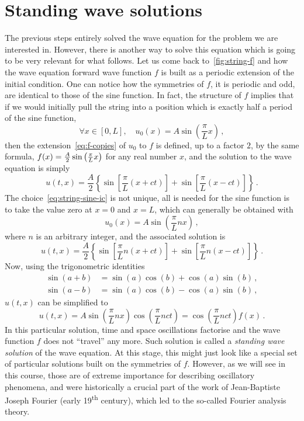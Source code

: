 \section{Standing wave solutions}
The previous steps entirely solved the wave equation for the problem we are interested in.
However, there is another way to solve this equation which is going to be very relevant
for what follows. Let us come back to~\cref{fig:string-f} and how the wave equation
forward wave function $f$ is built as a periodic extension of the initial condition. One
can notice how the symmetries of $f$, \ie it is periodic and odd, are identical to those
of the sine function. In fact, the structure of $f$ implies that if we would initially
pull the string into a position which is exactly half a period of the sine function, \ie
\begin{equation}
  \forall x\in[0,L],\quad u_0(x)=A\sin\left(\frac{\pi}{L}x\right)\,,\label{eq:string-sine-ic}
\end{equation}
then the extension~\cref{eq:f-copies} of $u_0$ to $f$ is defined, up to a factor $2$, by
the same formula, \ie $f(x)=\smash{\frac{A}{2}\sin\left(\frac{\pi}{L}x\right)}$ for any
real number $x$, and the solution to the wave equation is simply
\begin{equation}
  u(t,x)=\frac{A}{2}\left\{\sin\left[\frac{\pi}{L}(x+ct)\right]
  +\sin\left[\frac{\pi}{L}(x-ct)\right]\right\}\,.
\end{equation}
The choice~\cref{eq:string-sine-ic} is not unique, all is needed for the sine function is
to take the value zero at $x=0$ and $x=L$, which can generally be obtained with
\begin{equation}
  u_0(x)=A\sin\left(\frac{\pi}{L}nx\right)\,,
\end{equation}
where $n$ is an arbitrary integer, and the associated solution is
\begin{equation}
  u(t,x)=\frac{A}{2}\left\{\sin\left[\frac{\pi}{L}n(x+ct)\right]
  +\sin\left[\frac{\pi}{L}n(x-ct)\right]\right\}\,.
  \label{eq:stand-wave-travel}
\end{equation}
Now, using the trigonometric identities
\begin{align}
  \sin(a+b)&=\sin(a)\cos(b)+\cos(a)\sin(b)\,,\\
  \sin(a-b)&=\sin(a)\cos(b)-\cos(a)\sin(b)\,,
\end{align}
$u(t,x)$ can be simplified to
\begin{equation}
  u(t,x)=A\sin\left(\frac{\pi}{L}nx\right)\cos\left(\frac{\pi}{L}nct\right)
  =\cos\left(\frac{\pi}{L}nct\right)f(x)\,.
  \label{eq:stand-wave-example}
\end{equation}
In this particular solution, time and space oscillations factorise and the wave function
$f$ does not ``travel'' any more. Such solution is called a \emph{standing wave solution}
of the wave equation. At this stage, this might just look like a special set of particular
solutions built on the symmetries of $f$. However, as we will see in this course, those
are of extreme importance for describing oscillatory phenomena, and were historically a
crucial part of the work of Jean-Baptiste Joseph Fourier (early 19\textsuperscript{th}
century), which led to the so-called Fourier analysis theory.


